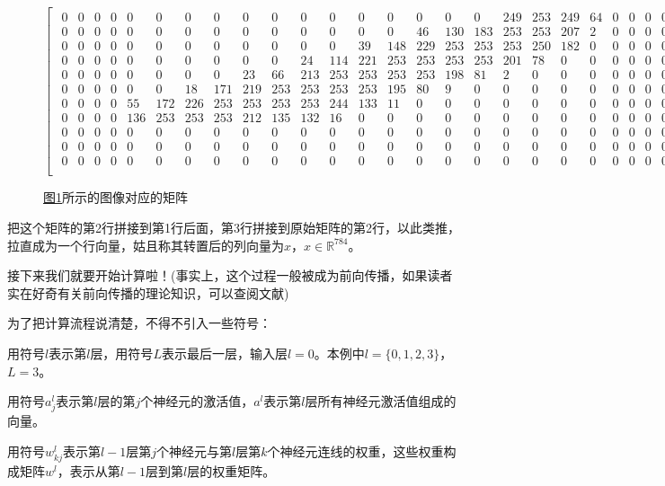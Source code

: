 \documentclass[titlepage,UTF8,zihao=-4]{ctexart}
\begin{document}
\begin{figure}
\begin{equation*}
\begin{bmatrix}
\begin{smallmatrix}
    0& 0& 0& 0& 0& 0& 0& 0& 0& 0& 0& 0& 0& 0& 0& 0& 0& 249& 253& 249& 64& 0& 0& 0& 0& 0& 0& 0 \\
    0& 0& 0& 0& 0& 0& 0& 0& 0& 0& 0& 0& 0& 0& 46& 130& 183& 253& 253& 207& 2& 0& 0& 0& 0& 0& 0& 0 \\
    0& 0& 0& 0& 0& 0& 0& 0& 0& 0& 0& 0& 39& 148& 229& 253& 253& 253& 250& 182& 0& 0& 0& 0& 0& 0& 0& 0 \\
    0& 0& 0& 0& 0& 0& 0& 0& 0& 0& 24& 114& 221& 253& 253& 253& 253& 201& 78& 0& 0& 0& 0& 0& 0& 0& 0& 0 \\
    0& 0& 0& 0& 0& 0& 0& 0& 23& 66& 213& 253& 253& 253& 253& 198& 81& 2& 0& 0& 0& 0& 0& 0& 0& 0& 0& 0 \\
    0& 0& 0& 0& 0& 0& 18& 171& 219& 253& 253& 253& 253& 195& 80& 9& 0& 0& 0& 0& 0& 0& 0& 0& 0& 0& 0& 0 \\
    0& 0& 0& 0& 55& 172& 226& 253& 253& 253& 253& 244& 133& 11& 0& 0& 0& 0& 0& 0& 0& 0& 0& 0& 0& 0& 0& 0 \\
    0& 0& 0& 0& 136& 253& 253& 253& 212& 135& 132& 16& 0& 0& 0& 0& 0& 0& 0& 0& 0& 0& 0& 0& 0& 0& 0& 0 \\
    0& 0& 0& 0& 0& 0& 0& 0& 0& 0& 0& 0& 0& 0& 0& 0& 0& 0& 0& 0& 0& 0& 0& 0& 0& 0& 0& 0 \\
    0& 0& 0& 0& 0& 0& 0& 0& 0& 0& 0& 0& 0& 0& 0& 0& 0& 0& 0& 0& 0& 0& 0& 0& 0& 0& 0& 0 \\
    0& 0& 0& 0& 0& 0& 0& 0& 0& 0& 0& 0& 0& 0& 0& 0& 0& 0& 0& 0& 0& 0& 0& 0& 0& 0& 0& 0 \\
    \end{smallmatrix}
    \end{bmatrix}
    \end{equation*}
    \caption{\hyperref[im1]{图1}所示的图像对应的矩阵}\label{matrix}
\end{figure}

把这个矩阵的第2行拼接到第1行后面，第3行拼接到原始矩阵的第2行，以此类推，拉直成为一个行向量，姑且称其转置后的列向量为$x$，$x\in \mathbb{R}^{784}$。

接下来我们就要开始计算啦！(事实上，这个过程一般被成为前向传播，如果读者实在好奇有关前向传播的理论知识，可以查阅文献\cite{MN,QXP})

为了把计算流程说清楚，不得不引入一些符号：

用符号$l$表示第$l$层，用符号$L$表示最后一层，输入层$l=0$。本例中$l=\{0,1,2,3\}$，$L=3$。

用符号$a^l_j$表示第$l$层的第$j$个神经元的激活值，$a^l$表示第$l$层所有神经元激活值组成的向量。

用符号$w_{kj}^l$表示第$l-1$层第$j$个神经元与第$l$层第$k$个神经元连线的权重，这些权重构成矩阵$w^l$，表示从第$l-1$层到第$l$层的权重矩阵。
\end{document}
